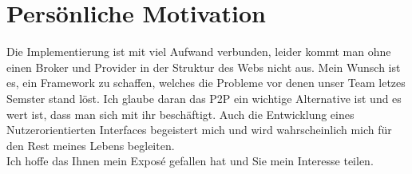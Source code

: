 \documentclass[10pt]{article}
\begin{document}
    \section{Persönliche Motivation}\label{sec:Motivation}
    Die Implementierung ist mit viel Aufwand verbunden, leider kommt man ohne einen Broker und Provider in der Struktur des Webs nicht aus. Mein Wunsch ist es, ein Framework zu schaffen, welches die Probleme vor denen unser Team letzes Semster stand löst. Ich glaube daran das P2P ein wichtige Alternative ist und es wert ist, dass man sich mit ihr beschäftigt. Auch die Entwicklung eines Nutzerorientierten Interfaces begeistert mich und wird wahrscheinlich mich für den Rest meines Lebens begleiten. \\
    Ich hoffe das Ihnen mein Exposé gefallen hat und Sie mein Interesse teilen.     

    \newpage
     
    
\end{document}
